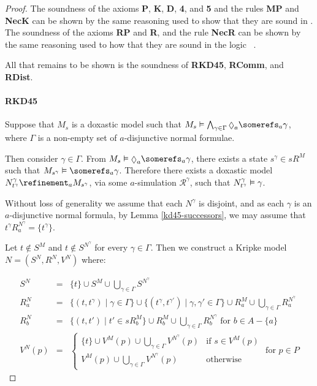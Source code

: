 \begin{proof}
The soundness of the axioms {\bf P}, {\bf K}, {\bf D}, {\bf 4}, and {\bf 5} and the
rules {\bf MP} and {\bf NecK} can be shown by the same reasoning used to show
that they are sound in \logicKD{}. The soundness of the axioms {\bf RP} and {\bf
R}, and the rule {\bf NecR} can be shown by the same reasoning used to how
that they are sound in the logic \logicKiF{}~\cite{french2010future}.

All that remains to be shown is the soundness of {\bf RKD45}, {\bf RComm}, and
{\bf RDist}.

\paragraph{RKD45}
Suppose that $M_s$ is a doxastic model such that $M_s \entails \bigwedge_{\gamma
\in \Gamma} \suspects_a \somerefs_a \gamma$, where $\Gamma$ is a non-empty set of
$a$-disjunctive normal formulae.

Then consider $\gamma \in \Gamma$. From $M_s \entails \suspects_a \somerefs_a
\gamma$, there exists a state $s^\gamma \in sR^M$ such that $M_{s^\gamma}
\entails \somerefs_a \gamma$. Therefore there exists a doxastic model
$N^\gamma_{t^\gamma} \refinement_a M_{s^\gamma}$, via some $a$-simulation
$\mathcal{R}^\gamma$, such that $N^\gamma_{t^\gamma} \vDash \gamma$.

Without loss of generality we assume that each $N^\gamma$ is disjoint, and as
each $\gamma$ is an $a$-disjunctive normal formula, by Lemma
\ref{kd45-successors}, we may assume that $t^\gamma R^{N^\gamma}_a =
\{t^\gamma\}$.

Let $t \notin S^M$ and $t \notin S^{N^\gamma}$ for every $\gamma \in \Gamma$.
Then we construct a Kripke model $N = (S^N, R^N, V^N)$ where:

\begin{eqnarray*}
S^N &=& \{t\} \cup S^M \cup \bigcup_{\gamma \in \Gamma} S^{N^\gamma}\\
R^N_a &=& \{(t, t^\gamma) \mid \gamma \in \Gamma\} 
\cup \{(t^\gamma, t^{\gamma'}) \mid \gamma, \gamma' \in \Gamma\} 
\cup R^M_a
\cup \bigcup_{\gamma \in \Gamma} R^{N^\gamma}_a\\
R^N_b &=& \{(t, t') \mid t' \in sR^M_b\}
\cup R^M_b
\cup \bigcup_{\gamma \in \Gamma} R^{N^\gamma}_b \text{ for $b \in A - \{a\}$}\\
V^N(p) &=& 
\begin{cases}
\{t\} \cup V^M(p) \cup \bigcup_{\gamma \in \Gamma} V^{N^\gamma}(p) & \text{if $s
\in V^M(p)$}\\
V^M(p) \cup \bigcup_{\gamma \in \Gamma} V^{N^\gamma}(p) & \text{otherwise}
\end{cases}
\text{ for $p \in P$}
\end{eqnarray*}


\end{proof}
